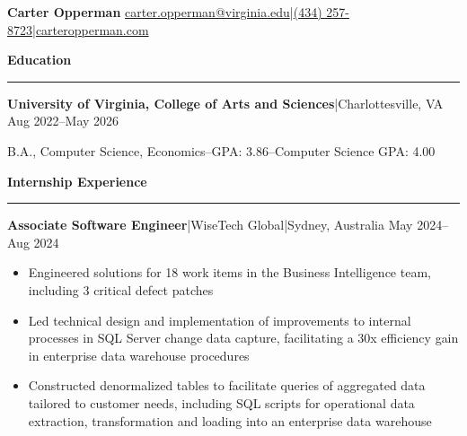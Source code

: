 \documentclass[11pt,letterpaper]{article}
\newcommand{\horibar}[2]{#1\hspace{5pt}|\hspace{5pt}#2}
\newcommand{\sep}[1]{\par\vspace{#1}}
\renewenvironment{section}[1]{
\sep{11pt}
{
\fontsize{14}{2}
\selectfont
\textbf{#1}\\[0.5pt]
}
\sep{4pt}
\noindent\rule{\linewidth}{0.5pt}
\sep{4pt}
}
{
}
\renewenvironment{subsection}[3]
{
\sep{4pt}
\horibar{\textbf{#1}}{#2} \hfill #3
\par\setstretch{1}
\begin{itemize}
}
{
\end{itemize}
\setstretch{0}
}
\begin{document}
{\fontsize{20}{1} \selectfont \textbf{Carter Opperman}} \hfill \horibar{\href{mailto:carter.opperman@virginia.edu}{carter.opperman@virginia.edu}}{\horibar{\href{tel:+14342578723}{(434) 257-8723}}{\href{https://carteropperman.com}{carteropperman.com}}}
\sep{5pt}

\begin{section}{Education}
    \sep{4pt}
    \horibar{\textbf{University of Virginia, College of Arts and Sciences}}{Charlottesville, VA} \hfill Aug 2022–May 2026
    \sep{4pt}
    \par\hspace{6pt}B.A., Computer Science, Economics\hspace{5pt}–\hspace{5pt}GPA: 3.86\hspace{5pt}–\hspace{5pt}Computer Science GPA: 4.00
    \sep{2pt}
\end{section}

\begin{section}{Internship Experience}
    \begin{subsection}{Associate Software Engineer}{\horibar{WiseTech Global}{Sydney, Australia}}{May 2024–Aug 2024}
        \item Engineered solutions for 18 work items in the Business Intelligence team, including 3 critical defect patches
        \item Led technical design and implementation of improvements to internal processes in SQL Server change data capture, facilitating a 30x efficiency gain in enterprise data warehouse procedures
        \item Constructed denormalized tables to facilitate queries of aggregated data tailored to customer needs, including SQL scripts for operational data extraction, transformation and loading into an enterprise data warehouse
    \end{subsection}
\end{section}
\end{document}
